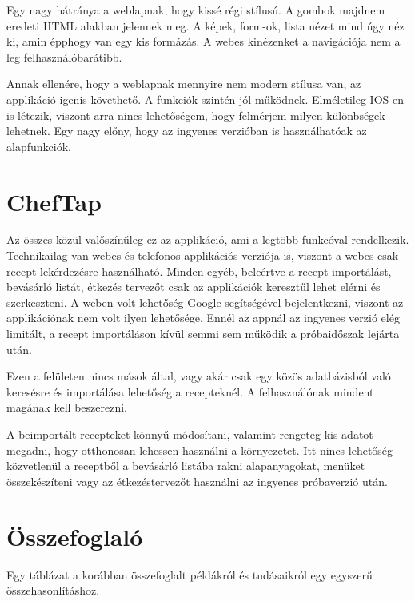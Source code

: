 \documentclass[12pt]{report}
\theoremstyle{definition}
\begin{document}
Egy nagy hátránya a weblapnak, hogy kissé régi stílusú. A gombok majdnem eredeti HTML alakban jelennek meg. A képek, form-ok, lista nézet mind úgy néz ki, amin épphogy van egy kis formázás. A webes kinézenket a navigációja nem a leg felhasználóbarátibb.

Annak ellenére, hogy a weblapnak mennyire nem modern stílusa van, az applikáció igenis követhető. A funkciók szintén jól működnek. Elméletileg IOS-en is létezik, viszont arra nincs lehetőségem, hogy felmérjem milyen különbségek lehetnek. Egy nagy előny, hogy az ingyenes verzióban is használhatóak az alapfunkciók.

\section{ChefTap}
Az összes közül valőszínűleg ez az applikáció, ami a legtöbb funkcóval rendelkezik. Technikailag van webes és telefonos applikációs verziója is, viszont a webes csak recept lekérdezésre használható. Minden egyéb, beleértve a recept importálást, bevásárló listát, étkezés tervezőt csak az applikációk keresztűl lehet elérni és szerkeszteni. A weben volt lehetőség Google segítségével bejelentkezni, viszont az applikációnak nem volt ilyen lehetősége. Ennél az appnál az ingyenes verzió elég limitált, a recept importáláson kívül semmi sem működik a próbaidőszak lejárta után.

Ezen a felületen nincs mások által, vagy akár csak egy közös adatbázisból való keresésre és importálása lehetőség a recepteknél. A felhasználónak mindent magának kell beszerezni.

A beimportált recepteket könnyű módosítani, valamint rengeteg kis adatot megadni, hogy otthonosan lehessen használni a környezetet. Itt nincs lehetőség közvetlenül a receptből a bevásárló listába rakni alapanyagokat, menüket összekészíteni vagy az étkezéstervezőt használni az ingyenes próbaverzió után.

\section{Összefoglaló}
Egy táblázat a korábban összefoglalt példákról és tudásaikról egy egyszerű összehasonlításhoz.

\newcommand{\cmark}{\ding{51}}%
\newcommand{\xmark}{\ding{55}}%
\end{document}
